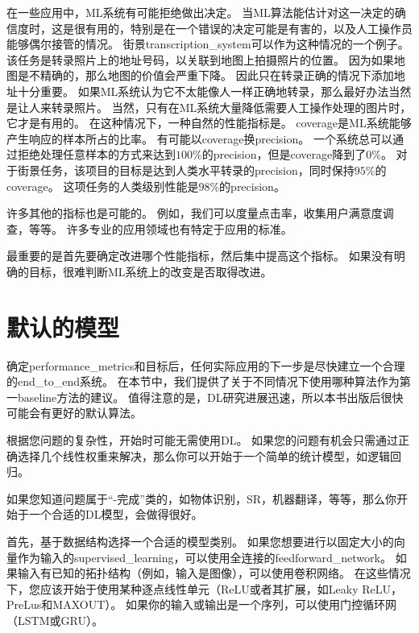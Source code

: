 
在一些应用中，\gls{ML}系统有可能拒绝做出决定。
当\gls{ML}算法能估计对这一决定的确信度时，这是很有用的，特别是在一个错误的决定可能是有害的，以及人工操作员能够偶尔接管的情况。
街景\gls{transcription_system}可以作为这种情况的一个例子。
该任务是转录照片上的地址号码，以关联到地图上拍摄照片的位置。
因为如果地图是不精确的，那么地图的价值会严重下降。
因此只在转录正确的情况下添加地址十分重要。
如果\gls{ML}系统认为它不太能像人一样正确地转录，那么最好办法当然是让人来转录照片。
当然，只有在\gls{ML}系统大量降低需要人工操作处理的图片时，它才是有用的。
在这种情况下，一种自然的性能指标是。
\gls{coverage}是\gls{ML}系统能够产生响应的样本所占的比率。
有可能以\gls{coverage}换\gls{precision}。
一个系统总可以通过拒绝处理任意样本的方式来达到$100\%$的\gls{precision}，但是\gls{coverage}降到了$0\%$。
对于街景任务，该项目的目标是达到人类水平转录的\gls{precision}，同时保持$95\%$的\gls{coverage}。
这项任务的人类级别性能是$98\%$的\gls{precision}。

许多其他的指标也是可能的。
例如，我们可以度量点击率，收集用户满意度调查，等等。
许多专业的应用领域也有特定于应用的标准。

最重要的是首先要确定改进哪个性能指标，然后集中提高这个指标。
如果没有明确的目标，很难判断\gls{ML}系统上的改变是否取得改进。


\section{默认的模型}
\label{sec:default_baseline_models}
确定\gls{performance_metrics}和目标后，任何实际应用的下一步是尽快建立一个合理的\gls{end_to_end}系统。
在本节中，我们提供了关于不同情况下使用哪种算法作为第一\gls{baseline}方法的建议。
值得注意的是，\gls{DL}研究进展迅速，所以本书出版后很快可能会有更好的默认算法。

根据您问题的复杂性，开始时可能无需使用\gls{DL}。
如果您的问题有机会只需通过正确选择几个线性权重来解决，那么你可以开始于一个简单的统计模型，如逻辑回归。

如果您知道问题属于``-完成''类的，如物体识别，\gls{SR}，机器翻译，等等，那么你开始于一个合适的\gls{DL}模型，会做得很好。

首先，基于数据结构选择一个合适的模型类别。
如果您想要进行以固定大小的向量作为输入的\gls{supervised_learning}，可以使用全连接的\gls{feedforward_network}。
如果输入有已知的拓扑结构（例如，输入是图像），可以使用卷积网络。
在这些情况下，您应该开始于使用某种逐点线性单元（ReLU或者其扩展，如Leaky ReLU，PreLus和MAXOUT）。
如果你的输入或输出是一个序列，可以使用门控循环网（LSTM或GRU）。

